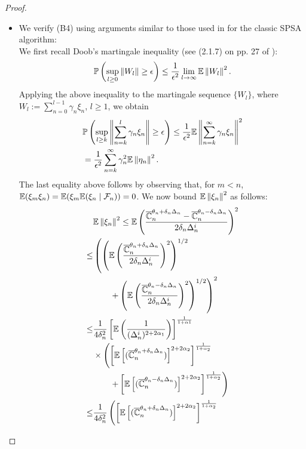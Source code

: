 \begin{proof}
\begin{itemize}
\item We verify (B4) using arguments similar to those used in \cite{spall} for the classic SPSA algorithm:\\
We first recall Doob's martingale inequality (see (2.1.7) on pp. 27 of \cite{kushner-clark}):
\begin{align}
\mathbb{P}\left(  \sup_{l\geq 0}   \left\|W_l\right\| \geq \epsilon  \right) \le \dfrac{1}{\epsilon^2} \lim_{l\rightarrow \infty} \mathbb{E} \left\|W_l\right\|^2. 
\end{align}
Applying the above inequality to the martingale sequence $\{W_l\}$, where  $W_l := \sum_{n=0}^{l-1} \gamma_n \xi_n$, $l\ge 1$, we obtain
\begin{align}
&\mathbb{P}\left(  \sup_{l\geq k}   \left\|\sum_{n=k}^{l} \gamma_n \xi_n\right\| \geq \epsilon  \right) \le \dfrac{1}{\epsilon^2} \mathbb{E} \left\|
\sum_{n=k}^{\infty} \gamma_n \xi_n\right\|^2 \nonumber\\
&= \dfrac{1}{\epsilon^2} \sum_{n=k}^{\infty} \gamma_n^2 \mathbb{E}\left\| \eta_n\right\|^2. \label{eq:b4}
\end{align}
The last equality above follows by observing that, for $m < n$, $\mathbb{E}(\xi_m \xi_n) = \mathbb{E}(\xi_m \mathbb{E}(\xi_n\mid \mathcal{F}_n))=0$.
We now bound $\mathbb{E}\left\| \xi_n\right\|^2$ as follows:
\begin{align}
&\E\left\| \xi_n\right\|^2\le \E\left(\dfrac{\overline \C_n^{\theta_n + \delta_n \Delta_n} -\overline \C_n^{\theta_n - \delta_n \Delta_n}}{2 \delta_n \Delta_n^i}\right)^2 \label{eq:mi}\\
\le &\left(\left(\E\left(\dfrac{\overline \C_n^{\theta_n + \delta_n \Delta_n}}{2 \delta_n \Delta_n^i}\right)^2\right)^{1/2}\right.\nonumber\\ 
&\qquad\left.+ \left(\E\left(\dfrac{\overline \C_n^{\theta_n - \delta_n \Delta_n}}{2 \delta_n \Delta_n^i}\right)^2\right)^{1/2}\right)^2 \label{eq:minko}\\
\le &\frac1{4\delta_n^2} \left[ \E\left(\frac1{(\Delta_n^i)^{2+2\alpha_1}}\right) \right]^{\frac{1}{1+\alpha1}} \nonumber\\
& \times \left(\left[\E\left[ (\overline \C_n^{\theta_n + \delta_n \Delta_n})\right]^{2+2\alpha_2}\right]^{\frac{1}{1+\alpha_2}} \right.\nonumber\\
&\left.\qquad+
\left[\E\left[ (\overline \C_n^{\theta_n - \delta_n \Delta_n})\right]^{2+2\alpha_2}\right]^{\frac{1}{1+\alpha_2}}\right)\label{eq:holder}\\
\le &\frac1{4\delta_n^2} \left(\left[\E\left[ (\overline \C_n^{\theta_n + \delta_n \Delta_n})\right]^{2+2\alpha_2}\right]^{\frac{1}{1+\alpha_2}} \right.\nonumber\\

\end{align}
\end{itemize}
\end{proof}
